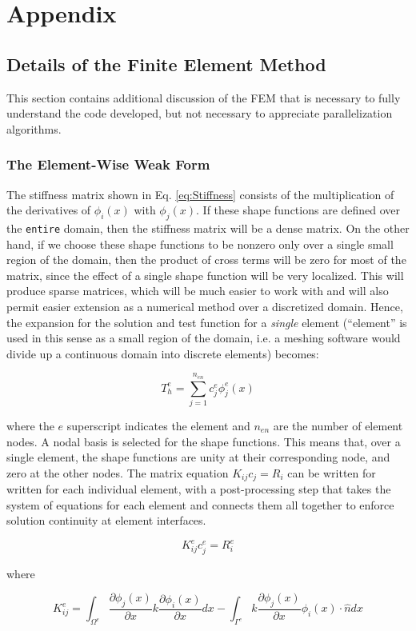 \documentclass[10pt]{article}
\newcommand{\beq}{\begin{equation}}
\newcommand{\eeq}{\end{equation}}
\begin{document}
\section{Appendix}
\subsection{Details of the Finite Element Method}
This section contains additional discussion of the FEM that is necessary to fully understand the code developed, but not necessary to appreciate parallelization algorithms.

\subsubsection{The Element-Wise Weak Form}
The stiffness matrix shown in Eq. \eqref{eq:Stiffness} consists of the multiplication of the derivatives of \(\phi_i(x)\) with \(\phi_j(x)\). If these shape functions are defined over the {\tt entire} domain, then the stiffness matrix will be a dense matrix. On the other hand, if we choose these shape functions to be nonzero only over a single small region of the domain, then the product of cross terms will be zero for most of the matrix, since the effect of a single shape function will be very localized. This will produce sparse matrices, which will be much easier to work with and will also permit easier extension as a numerical method over a discretized domain. Hence, the expansion for the solution and test function for a {\it single} element (``element'' is used in this sense as a small region of the domain, i.e. a meshing software would divide up a continuous domain into discrete elements) becomes:

\beq
T_h^e=\sum_{j=1}^{n_{en}}c_j^e\phi_j^e(x)
\eeq

where the \(e\) superscript indicates the element and \(n_{en}\) are the number of element nodes. A nodal basis is selected for the shape functions. This means that, over a single element, the shape functions are unity at their corresponding node, and zero at the other nodes. The matrix equation \(K_{ij}c_j=R_i\) can be written for written for each individual element, with a post-processing step that takes the system of equations for each element and connects them all together to enforce solution continuity at element interfaces. 

\beq
K_{ij}^ec_j^e=R_i^e
\eeq

where

\beq
K_{ij}^e=\int_{\Omega^e}\frac{\partial \phi_j(x)}{\partial x}k\frac{\partial\phi_i(x)}{\partial x}dx-\int_{\Gamma^e}k\frac{\partial \phi_j(x)}{\partial x}\phi_i(x)\cdot\hat{n}dx
\eeq
\end{document}

